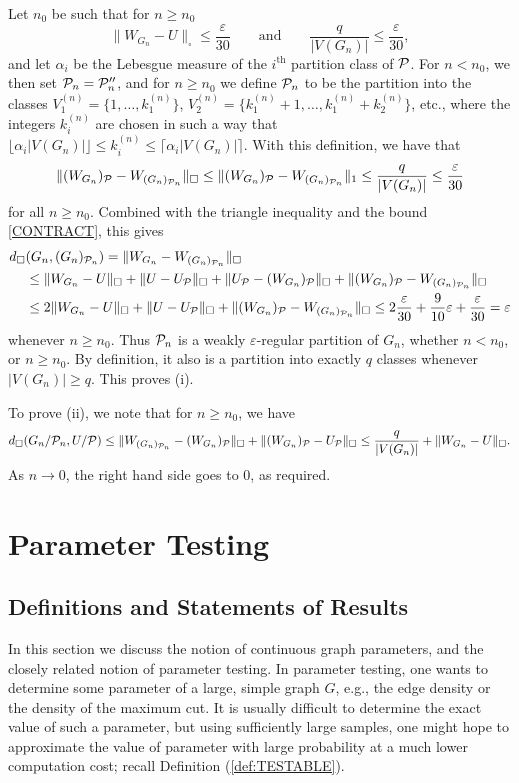 \documentclass[12pt]{article}
\numberwithin{equation}{section}
\def\eps{\varepsilon}
\def\PP{{\cal P}}\def\QQ{{\cal Q}}\def\RR{{\cal R}}
\begin{document}
Let $n_0$ be such that for $n\ge n_0$
\[
\|W_{G_n}-U\|_\square\leq \frac\eps {30}
\qquad\text{and}\qquad
\frac q{|V(G_n)|}\leq\frac\eps {30},
\]
and let $\alpha_i$ be the Lebesgue measure of the $i^{\text{th}}$
partition class of $\PP$. For $n<n_0$, we then set $\PP_n=\PP''_n$,
and for $n\geq n_0$ we define $\PP_n$ to be the partition into the
classes $V_1^{(n)}=\{1,\dots,k_1^{(n)}\}$,
$V_2^{(n)}=\{k_1^{(n)}+1,\dots,k_1^{(n)}+k_2^{(n)}\}$, etc., where
the integers $k_i^{(n)}$ are chosen in such a way that $\lfloor
\alpha_i |V(G_n)|\rfloor \leq k_i^{(n)}\leq \lceil \alpha_i
|V(G_n)|\rceil$. With this definition, we have that
\[
\|(W_{G_n})_\PP-W_{(G_n)_{\PP_n}}\|_\square
\leq
\|(W_{G_n})_\PP-W_{(G_n)_{\PP_n}}\|_1\leq \frac q{|V(G_n)|}\leq
\frac\eps{30}
\]
for all $n\geq n_0$.  Combined with the triangle inequality and
the bound \eqref{CONTRACT}, this gives
\[
\begin{aligned}
d_\square&(G_n,(G_n)_{\PP_n})
=\|W_{G_n}-W_{(G_n)_{\PP_n}}\|_\square
\\
&\leq
\|W_{G_n}-U\|_\square
+\|U-U_\PP\|_\square
+\|U_\PP-(W_{G_n})_{\PP}\|_\square
+\|(W_{G_n})_{\PP}-W_{(G_n)_{\PP_n}}\|_\square
\\
&\leq
2\|W_{G_n}-U\|_\square
+\|U-U_\PP\|_\square
+\|(W_{G_n})_\PP-W_{(G_n)_{\PP_n}}\|_\square
\leq 2\frac\eps{30} +\frac{9}{10}\eps+\frac\eps{30}=\eps
\end{aligned}
\]
whenever $n\geq n_0$.  Thus $\PP_n$ is a weakly $\eps$-regular
partition of $G_n$, whether $n<n_0$, or $n\geq n_0$. By definition,
it also is a partition into exactly $q$ classes whenever
$|V(G_n)|\geq q$.  This proves (i).

To prove (ii), we note that for $n\geq n_0$, we have
\[
d_\square(G_n/\PP_n,U/\PP)
\leq
\|W_{(G_n)_{\PP_n}}-(W_{G_n})_\PP\|_\square
+\|(W_{G_n})_\PP-U_\PP\|_\square
\leq
\frac q{|V(G_n)|}
+\|W_{G_n}-U\|_\square.
\]
As $n\to 0$, the right hand side goes to $0$, as required.

\section{Parameter Testing}
\label{sec:testing}

\subsection{Definitions and Statements of Results}

In this section we discuss the notion of continuous graph parameters,
and the closely related notion of parameter testing. In parameter
testing, one wants to determine some parameter of a large, {simple}
graph $G$, e.g., the edge density or the density of the maximum cut.
It is usually difficult to determine the exact value of such a
parameter, but using sufficiently large samples, one might hope to
approximate the value of parameter with large probability at a much
lower computation cost; recall Definition (\ref{def:TESTABLE}).
\end{document}
